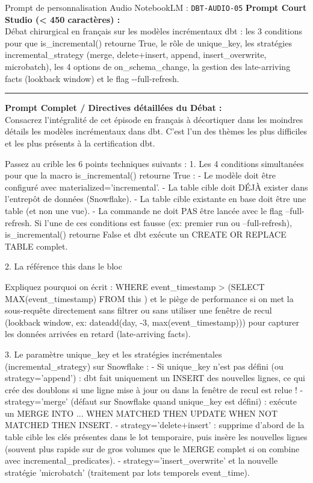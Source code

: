 \documentclass[11pt,a4paper]{article}
\begin{document}
\begin{promptbox}{Prompt de personnalisation Audio NotebookLM : \texttt{DBT-AUDIO-05}}
\textbf{Prompt Court Studio (< 450 caractères) :}\\
Débat chirurgical en français sur les modèles incrémentaux dbt : les 3 conditions pour que is\_incremental() retourne True, le rôle de unique\_key, les stratégies incremental\_strategy (merge, delete+insert, append, insert\_overwrite, microbatch), les 4 options de on\_schema\_change, la gestion des late-arriving facts (lookback window) et le flag -\hbox{}-full-refresh.

\medskip\hrule\medskip
\textbf{Prompt Complet / Directives détaillées du Débat :}\\
Consacrez l'intégralité de cet épisode en français à décortiquer dans les moindres détails les modèles incrémentaux dans dbt. C'est l'un des thèmes les plus difficiles et les plus présents à la certification dbt.

Passez au crible les 6 points techniques suivants :
1. Les 4 conditions simultanées pour que la macro is\_incremental() retourne True :
- Le modèle doit être configuré avec materialized='incremental'.
- La table cible doit DÉJÀ exister dans l'entrepôt de données (Snowflake).
- La table cible existante en base doit être une table (et non une vue).
- La commande ne doit PAS être lancée avec le flag --full-refresh.
Si l'une de ces conditions est fausse (ex: premier run ou --full-refresh), is\_incremental() retourne False et dbt exécute un CREATE OR REPLACE TABLE complet.

2. La référence {{ this }} dans le bloc {%
Expliquez pourquoi on écrit : WHERE event\_timestamp > (SELECT MAX(event\_timestamp) FROM {{ this }}) et le piège de performance si on met la sous-requête directement sans filtrer ou sans utiliser une fenêtre de recul (lookback window, ex: dateadd(day, -3, max(event\_timestamp))) pour capturer les données arrivées en retard (late-arriving facts).

3. Le paramètre unique\_key et les stratégies incrémentales (incremental\_strategy) sur Snowflake :
- Si unique\_key n'est pas défini (ou strategy='append') : dbt fait uniquement un INSERT des nouvelles lignes, ce qui crée des doublons si une ligne mise à jour ou dans la fenêtre de recul est relue !
- strategy='merge' (défaut sur Snowflake quand unique\_key est défini) : exécute un MERGE INTO ... WHEN MATCHED THEN UPDATE WHEN NOT MATCHED THEN INSERT.
- strategy='delete+insert' : supprime d'abord de la table cible les clés présentes dans le lot temporaire, puis insère les nouvelles lignes (souvent plus rapide sur de gros volumes que le MERGE complet si on combine avec incremental\_predicates).
- strategy='insert\_overwrite' et la nouvelle stratégie 'microbatch' (traitement par lots temporels event\_time).

}
\end{promptbox}
\end{document}
